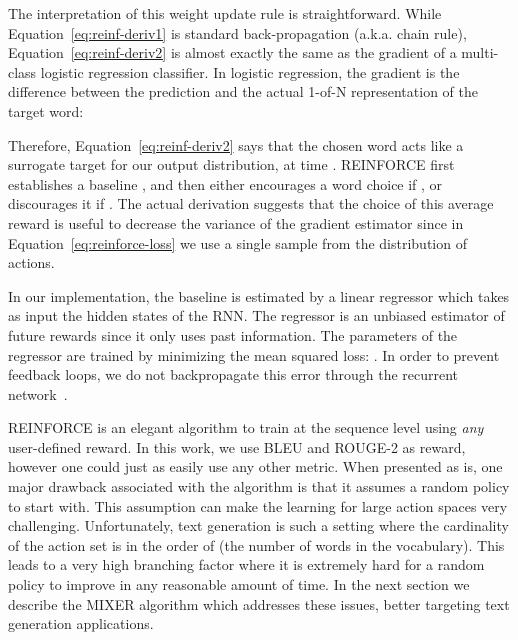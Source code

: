 \documentclass{article} \usepackage{iclr2016_conference,times}
\begin{document}
The interpretation of this weight update rule is straightforward. While
Equation~\ref{eq:reinf-deriv1} is standard back-propagation (a.k.a. chain
rule), Equation~\ref{eq:reinf-deriv2} is almost exactly the same as the gradient of a multi-class logistic regression classifier. In logistic regression, the gradient is the difference between the prediction and the actual 1-of-N representation of the target word:

Therefore, Equation~\ref{eq:reinf-deriv2} says that the chosen word 
acts like a surrogate target for our output distribution,
 at time . REINFORCE first establishes a baseline ,
and then either encourages a word choice  if , 
or discourages it if . The actual derivation suggests that the choice of this average reward  is useful to decrease the variance of the gradient estimator since in Equation~\ref{eq:reinforce-loss} we use a single sample from the distribution of actions. 

In our implementation, the baseline  is estimated by a linear regressor which takes as input the hidden states  of the RNN. The regressor is an unbiased estimator of future rewards since it only uses past information. The parameters of the regressor are
trained by minimizing the mean squared loss: .
In order to prevent feedback loops, we do not backpropagate this error through
the recurrent network~\citep{zaremba-arxiv2015}. 

REINFORCE is an elegant algorithm to train at the sequence level using {\em any} user-defined reward. In this work, we use BLEU and ROUGE-2 as reward, however one could just as easily use any other metric.
When presented as is, one major drawback associated with the algorithm is that it assumes a random
policy to start with. This assumption can make the learning for large action spaces very challenging.
Unfortunately, text generation is such a setting where the cardinality of the action set is in the order of  (the number of words in the vocabulary). 
This leads to a very high branching factor where it is extremely hard for a random policy to improve in any reasonable amount of time. 
In the next section we describe the MIXER algorithm which addresses these issues, better targeting
text generation applications.
\end{document}
